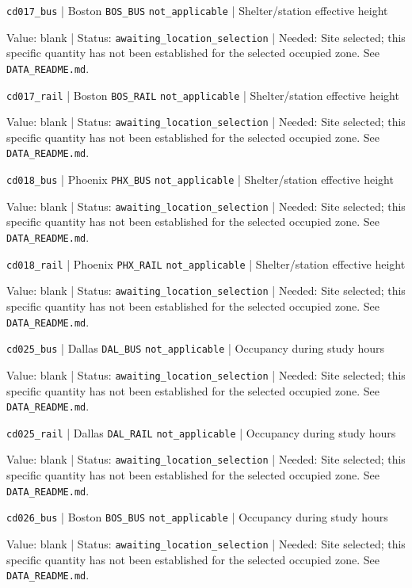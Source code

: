 \nolinkurl{cd017_bus} | Boston \nolinkurl{BOS_BUS} \nolinkurl{not_applicable} | Shelter/station effective height

Value: blank | Status: \nolinkurl{awaiting_location_selection} | Needed: Site selected; this specific quantity has not been established for the selected occupied zone. See \nolinkurl{DATA_README.md}.

\nolinkurl{cd017_rail} | Boston \nolinkurl{BOS_RAIL} \nolinkurl{not_applicable} | Shelter/station effective height

Value: blank | Status: \nolinkurl{awaiting_location_selection} | Needed: Site selected; this specific quantity has not been established for the selected occupied zone. See \nolinkurl{DATA_README.md}.

\nolinkurl{cd018_bus} | Phoenix \nolinkurl{PHX_BUS} \nolinkurl{not_applicable} | Shelter/station effective height

Value: blank | Status: \nolinkurl{awaiting_location_selection} | Needed: Site selected; this specific quantity has not been established for the selected occupied zone. See \nolinkurl{DATA_README.md}.

\nolinkurl{cd018_rail} | Phoenix \nolinkurl{PHX_RAIL} \nolinkurl{not_applicable} | Shelter/station effective height

Value: blank | Status: \nolinkurl{awaiting_location_selection} | Needed: Site selected; this specific quantity has not been established for the selected occupied zone. See \nolinkurl{DATA_README.md}.

\nolinkurl{cd025_bus} | Dallas \nolinkurl{DAL_BUS} \nolinkurl{not_applicable} | Occupancy during study hours

Value: blank | Status: \nolinkurl{awaiting_location_selection} | Needed: Site selected; this specific quantity has not been established for the selected occupied zone. See \nolinkurl{DATA_README.md}.

\nolinkurl{cd025_rail} | Dallas \nolinkurl{DAL_RAIL} \nolinkurl{not_applicable} | Occupancy during study hours

Value: blank | Status: \nolinkurl{awaiting_location_selection} | Needed: Site selected; this specific quantity has not been established for the selected occupied zone. See \nolinkurl{DATA_README.md}.

\nolinkurl{cd026_bus} | Boston \nolinkurl{BOS_BUS} \nolinkurl{not_applicable} | Occupancy during study hours

Value: blank | Status: \nolinkurl{awaiting_location_selection} | Needed: Site selected; this specific quantity has not been established for the selected occupied zone. See \nolinkurl{DATA_README.md}.


